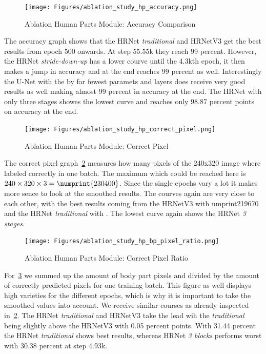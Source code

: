 \begin{figure}[H]
    \centering
    \texttt{[image: Figures/ablation\_study\_hp\_accuracy.png]}
    \decoRule
    \caption[Ablation Human Parts Module: Accuracy]{Ablation Human Parts Module: Accuracy Comparison}
    \label{fig:ablation-accuracy}
\end{figure}

The accuracy graph shows that the HRNet \textit{traditional} and HRNetV3 get the best results from epoch 500 onwards.
At step 55.55k they reach 99 percent.
However, the HRNet \textit{stride-down-up} has a lower courve until the 4.3kth epoch, it then makes a jump in accuracy
and at the end reaches 99 percent as well.
Interestingly the U-Net with the by far fewest paramets and layers does receive very good results as well making almost
99 percent in accuracy at the end.
The HRNet with only three stages showes the lowest curve and reaches only 98.87 percent points on accuracy at the end.

\begin{figure}[H]
    \centering
    \texttt{[image: Figures/ablation\_study\_hp\_correct\_pixel.png]}
    \decoRule
    \caption[Ablation Human Parts Module: Correct Pixel]{Ablation Human Parts Module: Correct Pixel}
    \label{fig:ablation-correct-px}
\end{figure}

The correct pixel graph~\ref{fig:ablation-correct-px} measures how many pixels of the 240x320 image where labeled correctly
in one batch. The maximum which could be reached here is $240\times320\times3=\numprint{230400}$.
Since the single epochs vary a lot it makes more sence to look at the smoothed results.
The courves again are very close to each other, with the best results coming from the HRNetV3 with umprint{219670} and
the HRNet \textit{traditional} with .
The lowest curve again shows the HRNet \textit{3 stages}.

\begin{figure}[H]
    \centering
    \texttt{[image: Figures/ablation\_study\_hp\_bp\_pixel\_ratio.png]}
    \decoRule
    \caption[Ablation Human Parts Module: Correctness Ratio]{Ablation Human Parts Module: Correct Pixel Ratio}
    \label{fig:correct-pixel-ratio}
\end{figure}

For~\ref{fig:correct-pixel-ratio} we summed up the amount of body part pixels and divided by the amount of correctly
predicted pixels for one training batch.
This figure as well displays high varieties for the different epochs, which is why it is important to take the smoothed
values into account. We receive similar courses as already inspected in~\ref{fig:ablation-correct-px}.
The HRNet \textit{traditional} and HRNetV3 take the lead wih the \textit{traditional} being slightly above the HRNetV3
with 0.05 percent points. With 31.44 percent the HRNet \textit{traditional} shows best results, whereas HRNet
\textit{3 blocks} performs worst with 30.38 percent at step 4.93k.

